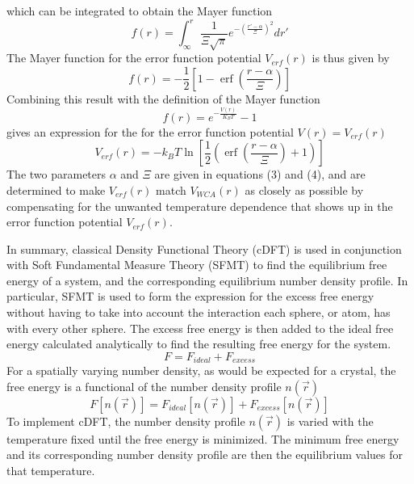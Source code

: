 \documentclass[double,12pt]{beavtex}
\begin{document}
which can be integrated to obtain the Mayer function
\begin{equation}{f(r)=\int_{\infty}^r{ \frac{1}{\Xi\sqrt{\pi}}e^{-\left(\frac{r'-\alpha}{\Xi}\right)^2}{dr'}}}\end{equation} 
The Mayer function for the error function potential $V_{erf}(r)$ is thus given by
\begin{equation}{f(r)=-\frac{1}{2}\left[1-\operatorname{erf}\left(\frac{r-\alpha}{\Xi}\right)\right]}\end{equation} Combining this result with the definition of the Mayer function \begin{displaymath}f(r)=e^{-\frac{V(r)}{K_BT}}-1\end{displaymath} %
gives an expression for the for the error function potential  $V(r)=V_{erf}(r)$ 
\begin{equation}{V_{erf}(r)=-k_BT\ln\left[\frac{1}{2}\left(\operatorname{erf}\left(\frac{r-\alpha}{\Xi}\right)+1\right)\right]}\end{equation} The two parameters $\alpha$ and $\Xi$ are given in equations (3) and (4), and are determined to make $V_{erf}(r)$ match $V_{WCA}(r)$ as closely as possible by compensating for the unwanted temperature dependence that shows up in the error function potential $V_{erf}(r)$.

In summary, classical Density Functional Theory (cDFT) is used in conjunction with Soft Fundamental Measure Theory (SFMT) to find the equilibrium free energy of a system, and the corresponding equilibrium number density profile. In particular, SFMT is used to form the expression for the excess free energy without having to take into account the interaction each sphere, or atom, has with every other sphere. The excess free energy is then added to the ideal free energy calculated analytically to find the resulting free energy for the system. 
\begin{equation}{F=F_{ideal} + F_{excess}}\end{equation} 
For a spatially varying number density, as would be expected for a crystal, the free energy is a functional of the number density profile $n(\vec{r})$  
\begin{equation}{F[n(\vec{r})]=F_{ideal}[n(\vec{r})] + F_{excess}[n(\vec{r})]}\end{equation} To implement cDFT, the number density profile $n(\vec{r})$ is varied with the temperature fixed until the free energy is minimized. The minimum free energy and its corresponding number density profile are then the equilibrium values for that temperature.  
\end{document}
